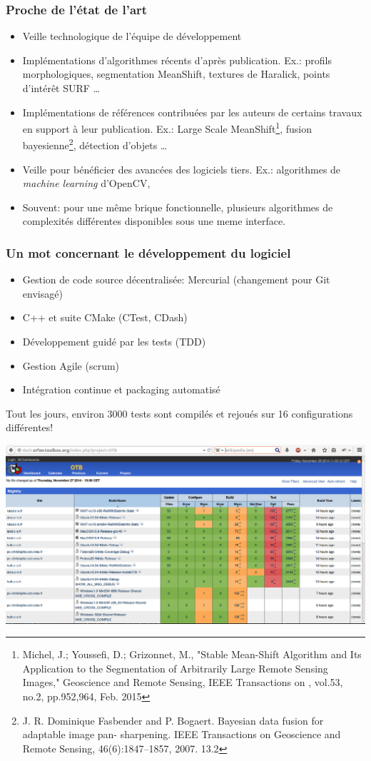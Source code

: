 \documentclass[8pt]{beamer}
\begin{document}
\begin{frame}
\frametitle{Proche de l'état de l'art}
\begin{itemize}
\item Veille technologique de l'équipe de développement
\item Implémentations d'algorithmes récents d'après publication. Ex.: profils morphologiques, segmentation MeanShift, textures de Haralick, points d'intérêt SURF \ldots
\item Implémentations de références contribuées par les auteurs de certains travaux en support à leur publication. Ex.: Large Scale MeanShift\footnote{Michel, J.; Youssefi, D.; Grizonnet, M., "Stable Mean-Shift Algorithm and Its Application to the Segmentation of Arbitrarily Large Remote Sensing Images," Geoscience and Remote Sensing, IEEE Transactions on , vol.53, no.2, pp.952,964, Feb. 2015}, fusion bayesienne\footnote{J. R. Dominique Fasbender and P. Bogaert. Bayesian data fusion for adaptable image pan-
sharpening. IEEE Transactions on Geoscience and Remote Sensing, 46(6):1847–1857, 2007.
13.2}, détection d'objets \ldots
\item Veille pour bénéficier des avancées des logiciels tiers. Ex.: algorithmes de \textit{machine learning} d'OpenCV,
\item Souvent: pour une même brique fonctionnelle, plusieurs algorithmes de complexités différentes disponibles sous une meme interface.
\end{itemize}
\end{frame}

\begin{frame}
\frametitle{Un mot concernant le développement du logiciel}
\vspace{-0.5cm}
\begin{itemize}
\item Gestion de code source décentralisée: Mercurial (changement pour Git envisagé)
\item C++ et suite CMake (CTest, CDash)
\item Développement guidé par les tests (TDD)
\item Gestion Agile (scrum)
\item Intégration continue et packaging automatisé
\end{itemize}
Tout les jours, environ 3000 tests sont compilés et rejoués sur 16 configurations différentes!
\begin{center}
\includegraphics[width=\textwidth,trim=0 250 0 0,clip=true]{images/dashboard.png}
\end{center}
\end{frame}
\end{document}
